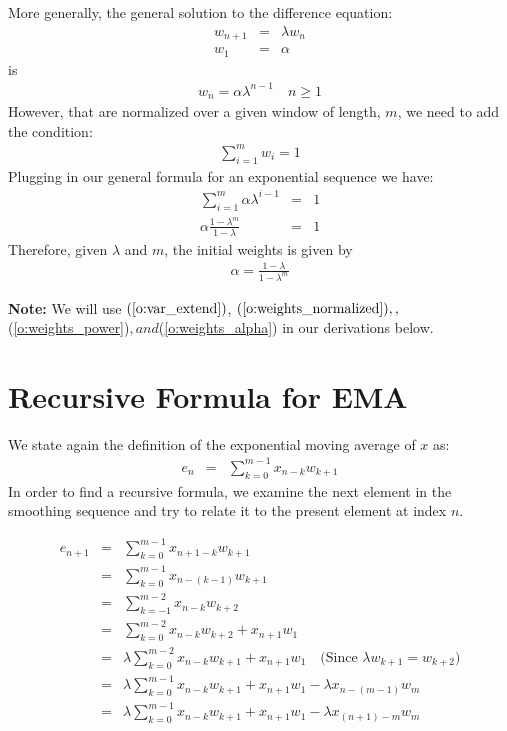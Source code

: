 \documentclass{article}
\begin{document}
More generally, the general solution to the difference equation:
\begin{eqnarray}
	w_{n+1} & = & \lambda w_n \\
	w_1 & = & \alpha
\end{eqnarray}
is 
\begin{eqnarray}
	w_n = \alpha \lambda^{n-1} \quad n \ge 1
\end{eqnarray}
However, that are normalized over a given window of length, $m$, we 
need to add the condition:
\begin{eqnarray}
\sum_{i=1}^m w_i = 1
\end{eqnarray}
Plugging in our general formula for an exponential sequence we have:
\begin{eqnarray}
	\sum_{i=1}^m \alpha \lambda^{i-1} & = & 1 \\
	\alpha \frac{1 - \lambda^m}{1 - \lambda} & = & 1	
\end{eqnarray}
Therefore, given $\lambda$ and $m$, the initial weights is given by 
\begin{eqnarray}
	\alpha = \frac{1 - \lambda}{1 - \lambda^m} \label{o:weights_alpha}
\end{eqnarray}

{\bf Note:\/} We will use $(\ref{o:var_extend})$, $(\ref{o:weights_normalized}),
, $(\ref{o:weights_power})$, and $(\ref{o:weights_alpha}) in our derivations below.

\section{Recursive Formula for EMA}
We state again the definition of the exponential moving average of $x$ as:
\begin{eqnarray}
    e_n &=& \sum_{k=0}^{m-1} x_{n-k} w_{k+1} 
\end{eqnarray}
In order to find a recursive formula, we examine the next element in the smoothing sequence 
and try to relate it to the present element at index $n$.

\begin{eqnarray*}
    e_{n+1} &=&  \sum_{k=0}^{m-1} x_{n+1-k} w_{k+1} \\
        &=&  \sum_{k=0}^{m-1} x_{n-(k-1)} w_{k+1} \\
        &=&  \sum_{k=-1}^{m-2} x_{n-k} w_{k+2}  \\
        &=&  \sum_{k=0}^{m-2} x_{n-k} w_{k+2}  + x_{n+1} w_1 \\
        &=&  \lambda \sum_{k=0}^{m-2} x_{n-k} w_{k+1}  + x_{n+1} w_1  \quad \text{(Since $\lambda w_{k+1} = w_{k+2}$)} \\
        &=&  \lambda \sum_{k=0}^{m-1} x_{n-k} w_{k+1}  + x_{n+1} w_1  
                - \lambda x_{n-(m-1)} w_m  \\
        &=&  \lambda \sum_{k=0}^{m-1} x_{n-k} w_{k+1}  + x_{n+1} w_1  
                - \lambda x_{(n+1)-m} w_m  
\end{eqnarray*}
\end{document}
